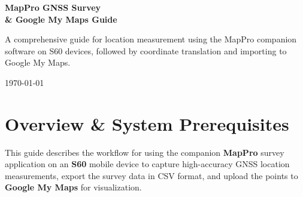 \documentclass[11pt, letterpaper]{article}
\begin{document}
\begin{titlepage}
    \centering
    \vspace*{2in}
    
    {\Huge\bfseries\color{primary} MapPro GNSS Survey \\[0.5ex] \& Google My Maps Guide\par}
    
    \vspace{1.5in}
    
    {\Large\color{secondary} A comprehensive guide for location measurement using the MapPro companion software on S60 devices, followed by coordinate translation and importing to Google My Maps.\par}
    
    \vfill
    
    {\large \today\par}
\end{titlepage}

\tableofcontents
\clearpage

\section{Overview \& System Prerequisites}

This guide describes the workflow for using the companion \textbf{MapPro} survey application on an \textbf{S60} mobile device to capture high-accuracy GNSS location measurements, export the survey data in CSV format, and upload the points to \textbf{Google My Maps} for visualization.
\end{document}
